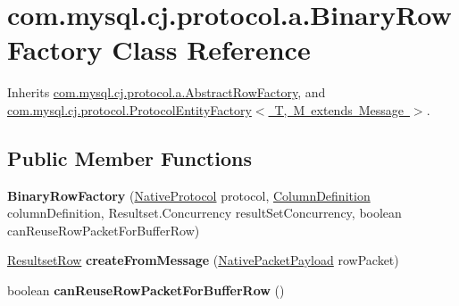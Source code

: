 \hypertarget{classcom_1_1mysql_1_1cj_1_1protocol_1_1a_1_1_binary_row_factory}{}\section{com.\+mysql.\+cj.\+protocol.\+a.\+Binary\+Row\+Factory Class Reference}
\label{classcom_1_1mysql_1_1cj_1_1protocol_1_1a_1_1_binary_row_factory}


Inherits \mbox{\hyperlink{classcom_1_1mysql_1_1cj_1_1protocol_1_1a_1_1_abstract_row_factory}{com.\+mysql.\+cj.\+protocol.\+a.\+Abstract\+Row\+Factory}}, and \mbox{\hyperlink{interfacecom_1_1mysql_1_1cj_1_1protocol_1_1_protocol_entity_factory}{com.\+mysql.\+cj.\+protocol.\+Protocol\+Entity\+Factory$<$ T, M extends Message $>$}}.

\subsection*{Public Member Functions}
\begin{DoxyCompactItemize}
\item 
\mbox{\label{classcom_1_1mysql_1_1cj_1_1protocol_1_1a_1_1_binary_row_factory_a5a203b6e4cd92e3ac271a55815a4d3b5}} 
{\bfseries Binary\+Row\+Factory} (\mbox{\hyperlink{classcom_1_1mysql_1_1cj_1_1protocol_1_1a_1_1_native_protocol}{Native\+Protocol}} protocol, \mbox{\hyperlink{interfacecom_1_1mysql_1_1cj_1_1protocol_1_1_column_definition}{Column\+Definition}} column\+Definition, Resultset.\+Concurrency result\+Set\+Concurrency, boolean can\+Reuse\+Row\+Packet\+For\+Buffer\+Row)
\item 
\mbox{\label{classcom_1_1mysql_1_1cj_1_1protocol_1_1a_1_1_binary_row_factory_a02bc6bd4142c4797180e402e70065e7e}} 
\mbox{\hyperlink{interfacecom_1_1mysql_1_1cj_1_1protocol_1_1_resultset_row}{Resultset\+Row}} {\bfseries create\+From\+Message} (\mbox{\hyperlink{classcom_1_1mysql_1_1cj_1_1protocol_1_1a_1_1_native_packet_payload}{Native\+Packet\+Payload}} row\+Packet)
\item 
\mbox{\label{classcom_1_1mysql_1_1cj_1_1protocol_1_1a_1_1_binary_row_factory_a01899a9aa9f25f09a64fe8b3d43379f8}} 
boolean {\bfseries can\+Reuse\+Row\+Packet\+For\+Buffer\+Row} ()
\end{DoxyCompactItemize}
